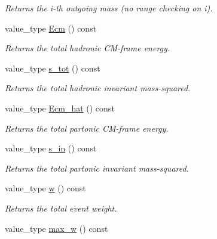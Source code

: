 \begin{DoxyCompactItemize}
\begin{DoxyCompactList}\small\item\em Returns the i-\/th outgoing mass (no range checking on i). \end{DoxyCompactList}\item 
\hypertarget{a00450_ad2cd771c9367fc65df19d5b2ecdc408b}{}value\+\_\+type \hyperlink{a00450_ad2cd771c9367fc65df19d5b2ecdc408b}{Ecm} () const \label{a00450_ad2cd771c9367fc65df19d5b2ecdc408b}

\begin{DoxyCompactList}\small\item\em Returns the total hadronic C\+M-\/frame energy. \end{DoxyCompactList}\item 
\hypertarget{a00450_a537a3b843c6f344767b390af3c3d2c2e}{}value\+\_\+type \hyperlink{a00450_a537a3b843c6f344767b390af3c3d2c2e}{s\+\_\+tot} () const \label{a00450_a537a3b843c6f344767b390af3c3d2c2e}

\begin{DoxyCompactList}\small\item\em Returns the total hadronic invariant mass-\/squared. \end{DoxyCompactList}\item 
\hypertarget{a00450_a19143c958a21b0c29eabfdabb086181a}{}value\+\_\+type \hyperlink{a00450_a19143c958a21b0c29eabfdabb086181a}{Ecm\+\_\+hat} () const \label{a00450_a19143c958a21b0c29eabfdabb086181a}

\begin{DoxyCompactList}\small\item\em Returns the total partonic C\+M-\/frame energy. \end{DoxyCompactList}\item 
\hypertarget{a00450_afde32db9f67bb2e845f80ee6c0473b78}{}value\+\_\+type \hyperlink{a00450_afde32db9f67bb2e845f80ee6c0473b78}{s\+\_\+in} () const \label{a00450_afde32db9f67bb2e845f80ee6c0473b78}

\begin{DoxyCompactList}\small\item\em Returns the total partonic invariant mass-\/squared. \end{DoxyCompactList}\item 
\hypertarget{a00450_a7129e1370ce585ae74defff94878d680}{}value\+\_\+type \hyperlink{a00450_a7129e1370ce585ae74defff94878d680}{w} () const \label{a00450_a7129e1370ce585ae74defff94878d680}

\begin{DoxyCompactList}\small\item\em Returns the total event weight. \end{DoxyCompactList}\item 
\hypertarget{a00450_a1d5f904414f9b7a2d505b0e1a434650c}{}value\+\_\+type \hyperlink{a00450_a1d5f904414f9b7a2d505b0e1a434650c}{max\+\_\+w} () const \label{a00450_a1d5f904414f9b7a2d505b0e1a434650c}


\end{DoxyCompactItemize}
